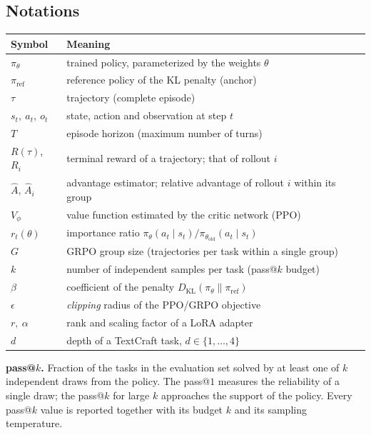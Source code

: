 \documentclass[11pt,a4paper]{article}
\begin{document}
\subsection*{Notations}
\begin{tabular}{ll}
\toprule
Symbol & Meaning \\
\midrule
$\pi_\theta$ & trained policy, parameterized by the weights $\theta$ \\
$\pi_{\text{ref}}$ & reference policy of the KL penalty (anchor) \\
$\tau$ & trajectory (complete episode) \\
$s_t,\ a_t,\ o_t$ & state, action and observation at step $t$ \\
$T$ & episode horizon (maximum number of turns) \\
$R(\tau)$, $R_i$ & terminal reward of a trajectory; that of rollout $i$ \\
$\hat{A}$, $\hat{A}_i$ & advantage estimator; relative advantage of rollout $i$ within its group \\
$V_\phi$ & value function estimated by the critic network (PPO) \\
$r_t(\theta)$ & importance ratio $\pi_\theta(a_t \mid s_t)/\pi_{\theta_{\text{old}}}(a_t \mid s_t)$ \\
$G$ & GRPO group size (trajectories per task within a single group) \\
$k$ & number of independent samples per task (pass@$k$ budget) \\
$\beta$ & coefficient of the penalty $D_{\text{KL}}(\pi_\theta \parallel \pi_{\text{ref}})$ \\
$\epsilon$ & \emph{clipping} radius of the PPO/GRPO objective \\
$r,\ \alpha$ & rank and scaling factor of a LoRA adapter \\
$d$ & depth of a TextCraft task, $d \in \{1,\dots,4\}$ \\


\bottomrule
\end{tabular}

\medskip
\noindent\textbf{pass@$k$.} Fraction of the tasks in the evaluation set solved by
at least one of $k$ independent draws from the policy. The pass@$1$
measures the reliability of a single draw; the pass@$k$ for large $k$ approaches the
support of the policy. Every pass@$k$ value is reported together with its budget
$k$ and its sampling temperature.
\end{document}
